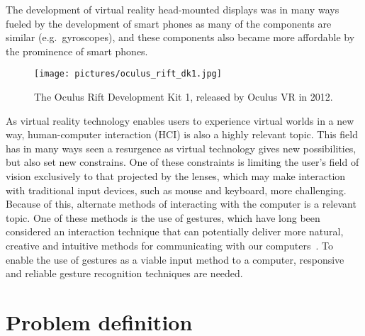 The development of virtual reality head-mounted displays was in many ways fueled by the development of smart phones as many of the components are similar (e.g.~gyroscopes), and
these components also became more affordable by the prominence of smart phones. 

\begin{figure}%
	\texttt{[image: pictures/oculus\_rift\_dk1.jpg]}
	\caption[The Oculus Rift Development Kit 1]{The Oculus Rift Development Kit 1, released by Oculus VR in 2012.}
	\label{fig:oculus}
\end{figure}

As virtual reality technology enables users to experience virtual worlds in a new way, 
human-computer interaction (HCI) is also a highly relevant topic. 
This field has in many ways seen a resurgence as virtual technology gives new possibilities, but also set new constrains. 
One of these constraints is limiting the user's field of vision exclusively to that projected by the lenses, 
which may make interaction with traditional input devices, such as mouse and keyboard, more challenging. 
Because of this, alternate methods of interacting with the computer is a relevant topic. 
One of these methods is the use of gestures, 
which have long been considered an interaction technique that can potentially deliver more natural, 
creative and intuitive methods for communicating with our computers~\citep{Rautaray2015}. 
To enable the use of gestures as a viable input method to a computer, responsive and reliable gesture recognition techniques are needed.  

\section{Problem definition}


